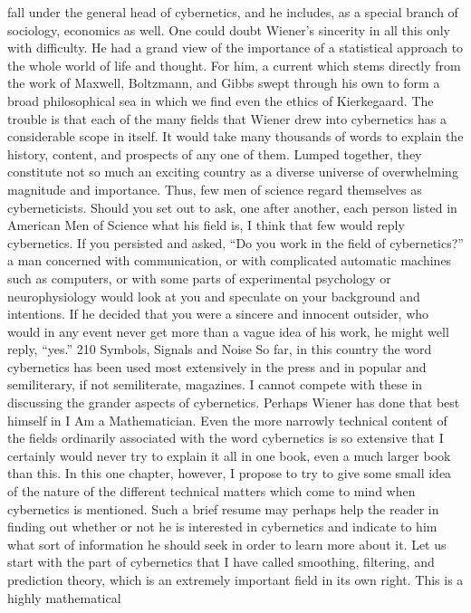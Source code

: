 {{{{{{{{{{{fall under the general head of cybernetics, and he includes,
as a special branch of sociology, economics as well.
One could doubt Wiener’s sincerity in all this only with difficulty.
He had a grand view of the importance of a statistical approach
to the whole world of life and thought. For him, a current which
stems directly from the work of Maxwell, Boltzmann, and Gibbs
swept through his own to form a broad philosophical sea in
which we find even the ethics of Kierkegaard.
The trouble is that each of the many fields that Wiener drew
into cybernetics has a considerable scope in itself. It would take
many thousands of words to explain the history, content, and
prospects of any one of them. Lumped together, they constitute
not so much an exciting country as a diverse universe of overwhelming
magnitude and importance.
Thus, few men of science regard themselves as cyberneticists.
Should you set out to ask, one after another, each person listed in
American Men of Science what his field is, I think that few would
reply cybernetics. If you persisted and asked, “Do you work in the
field of cybernetics?” a man concerned with communication, or
with complicated automatic machines such as computers, or with
some parts of experimental psychology or neurophysiology would
look at you and speculate on your background and intentions. If
he decided that you were a sincere and innocent outsider, who
would in any event never get more than a vague idea of his work,
he might well reply, “yes.”
210
Symbols, Signals and Noise
So far, in this country the word cybernetics has been used most
extensively in the press and in popular and semiliterary, if not
semiliterate, magazines. I cannot compete with these in discussing
the grander aspects of cybernetics. Perhaps Wiener has done that
best himself in I Am a Mathematician. Even the more narrowly
technical content of the fields ordinarily associated with the word
cybernetics is so extensive that I certainly would never try to
explain it all in one book, even a much larger book than this.
In this one chapter, however, I propose to try to give some small
idea of the nature of the different technical matters which come
to mind when cybernetics is mentioned. Such a brief resume may
perhaps help the reader in finding out whether or not he is interested
in cybernetics and indicate to him what sort of information
he should seek in order to learn more about it.
Let us start with the part of cybernetics that I have called
smoothing, filtering, and prediction theory, which is an extremely
important field in its own right. This is a highly mathematical
}}}}}}}}}}}
